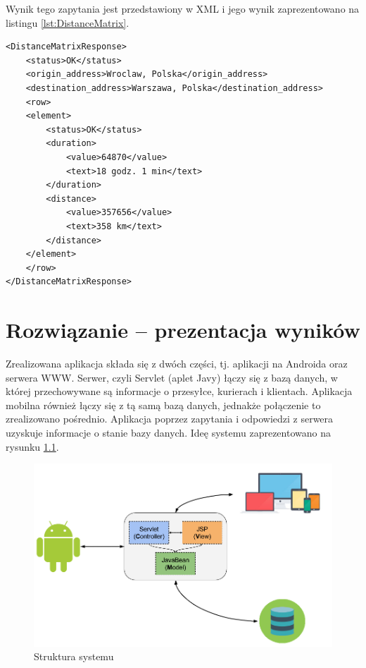 \documentclass[eng,printmode,oneside]{mgr}
\begin{document}
Wynik tego zapytania jest przedstawiony w XML i jego wynik zaprezentowano na
listingu \ref{lst:DistanceMatrix}.

\begin{lstlisting}[caption=Przykład odpowiedzi na zapytanie
\texttt{DistanceMatrix}\, trasa Wrocław -- Warszawa,label=lst:DistanceMatrix] 
<DistanceMatrixResponse>
	<status>OK</status>
	<origin_address>Wroclaw, Polska</origin_address>
	<destination_address>Warszawa, Polska</destination_address>
	<row>
	<element>
		<status>OK</status>
		<duration>
			<value>64870</value>
			<text>18 godz. 1 min</text>
		</duration>
		<distance>
			<value>357656</value>
			<text>358 km</text>
		</distance>
	</element>
	</row>
</DistanceMatrixResponse>
\end{lstlisting}

\chapter{Rozwiązanie -- prezentacja wyników}

Zrealizowana aplikacja składa się z dwóch części, tj. aplikacji na Androida oraz
serwera WWW. Serwer, czyli Servlet (aplet Javy) łączy się z bazą
danych, w której przechowywane są informacje o przesyłce, kurierach i
klientach. Aplikacja mobilna również łączy się z tą samą bazą danych,
jednakże połączenie to zrealizowano pośrednio. Aplikacja poprzez zapytania i odpowiedzi z
serwera uzyskuje informacje o stanie bazy danych. Ideę systemu zaprezentowano na
rysunku \ref{StrukturaSystemu}. 

\begin{figure}[h]
\centering
\includegraphics[width=1\textwidth]{StrukturaSystemu.png}
\caption{Struktura systemu}
\label{StrukturaSystemu}
\end{figure}
\end{document}
